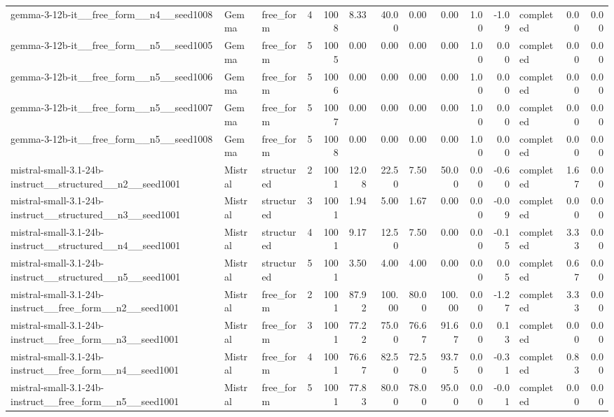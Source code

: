 \begin{longtable}{lllrrrrrrrrlrr}
gemma-3-12b-it\_\_free\_form\_\_n4\_\_seed1008 & Gemma & free\_form & 4 & 1008 & 8.33 & 40.00 & 0.00 & 0.00 & 1.00 & -1.09 & completed & 0.00 & 0.00 \\
gemma-3-12b-it\_\_free\_form\_\_n5\_\_seed1005 & Gemma & free\_form & 5 & 1005 & 0.00 & 0.00 & 0.00 & 0.00 & 1.00 & 0.00 & completed & 0.00 & 0.00 \\
gemma-3-12b-it\_\_free\_form\_\_n5\_\_seed1006 & Gemma & free\_form & 5 & 1006 & 0.00 & 0.00 & 0.00 & 0.00 & 1.00 & 0.00 & completed & 0.00 & 0.00 \\
gemma-3-12b-it\_\_free\_form\_\_n5\_\_seed1007 & Gemma & free\_form & 5 & 1007 & 0.00 & 0.00 & 0.00 & 0.00 & 1.00 & 0.00 & completed & 0.00 & 0.00 \\
gemma-3-12b-it\_\_free\_form\_\_n5\_\_seed1008 & Gemma & free\_form & 5 & 1008 & 0.00 & 0.00 & 0.00 & 0.00 & 1.00 & 0.00 & completed & 0.00 & 0.00 \\
mistral-small-3.1-24b-instruct\_\_structured\_\_n2\_\_seed1001 & Mistral & structured & 2 & 1001 & 12.08 & 22.50 & 7.50 & 50.00 & 0.00 & -0.60 & completed & 1.67 & 0.00 \\
mistral-small-3.1-24b-instruct\_\_structured\_\_n3\_\_seed1001 & Mistral & structured & 3 & 1001 & 1.94 & 5.00 & 1.67 & 0.00 & 0.00 & -0.09 & completed & 0.00 & 0.00 \\
mistral-small-3.1-24b-instruct\_\_structured\_\_n4\_\_seed1001 & Mistral & structured & 4 & 1001 & 9.17 & 12.50 & 7.50 & 0.00 & 0.00 & -0.15 & completed & 3.33 & 0.00 \\
mistral-small-3.1-24b-instruct\_\_structured\_\_n5\_\_seed1001 & Mistral & structured & 5 & 1001 & 3.50 & 4.00 & 4.00 & 0.00 & 0.00 & 0.05 & completed & 0.67 & 0.00 \\
mistral-small-3.1-24b-instruct\_\_free\_form\_\_n2\_\_seed1001 & Mistral & free\_form & 2 & 1001 & 87.92 & 100.00 & 80.00 & 100.00 & 0.00 & -1.27 & completed & 3.33 & 0.00 \\
mistral-small-3.1-24b-instruct\_\_free\_form\_\_n3\_\_seed1001 & Mistral & free\_form & 3 & 1001 & 77.22 & 75.00 & 76.67 & 91.67 & 0.00 & 0.13 & completed & 0.00 & 0.00 \\
mistral-small-3.1-24b-instruct\_\_free\_form\_\_n4\_\_seed1001 & Mistral & free\_form & 4 & 1001 & 76.67 & 82.50 & 72.50 & 93.75 & 0.00 & -0.31 & completed & 0.83 & 0.00 \\
mistral-small-3.1-24b-instruct\_\_free\_form\_\_n5\_\_seed1001 & Mistral & free\_form & 5 & 1001 & 77.83 & 80.00 & 78.00 & 95.00 & 0.00 & -0.01 & completed & 0.00 & 0.00 \\

\end{longtable}
